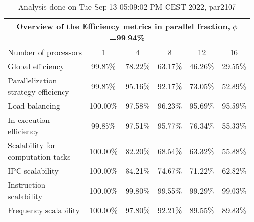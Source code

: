 \begin{table}[h]
\begin{center}
\begin{tabular}{|l|c|c|c|c|c|}
\hline
\multicolumn{6}{|c|}{Overview of the Efficiency metrics in parallel fraction, $\phi$=99.94\%} \\
\hline
\hline
Number of processors & 1 & 4 & 8 & 12 & 16 \\
\hline
\hline
Global efficiency                      &     99.85\% &     78.22\% &     63.17\% &     46.26\% &     29.55\% \\
\hline
\hline
Parallelization strategy efficiency &     99.85\% &     95.16\% &     92.17\% &     73.05\% &     52.89\% \\
\hline
Load balancing                   &    100.00\% &     97.58\% &     96.23\% &     95.69\% &     95.59\% \\
In execution efficiency          &     99.85\% &     97.51\% &     95.77\% &     76.34\% &     55.33\% \\
\hline
\hline
Scalability for computation tasks   &    100.00\% &     82.20\% &     68.54\% &     63.32\% &     55.88\% \\
\hline
IPC scalability                  &    100.00\% &     84.21\% &     74.67\% &     71.22\% &     62.82\% \\
Instruction scalability          &    100.00\% &     99.80\% &     99.55\% &     99.29\% &     99.03\% \\
Frequency scalability            &    100.00\% &     97.80\% &     92.21\% &     89.55\% &     89.83\% \\
\hline
\end{tabular}
\end{center}
\caption{ Analysis done on Tue Sep 13 05:09:02 PM CEST 2022, par2107}
\end{table}
